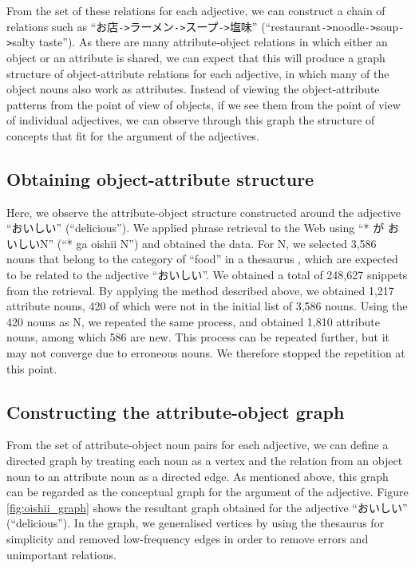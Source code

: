 \documentclass[english]{jnlp_1.4}
\begin{document}
From the set of these relations for each adjective, we can construct
a chain of relations such as ``お店\verb+->+ラーメン\verb+->+スープ\verb+->+塩味''
(``restaurant\verb|->|noodle\verb|->|soup\verb|->|salty taste''). As
there are many attribute-object relations in which either an object
or an attribute is shared, we can expect that this will produce
a graph structure of object-attribute relations for each adjective,
in which many of the object nouns also work as attributes.
Instead of viewing the object-attribute patterns from the point of view of
objects, if we see them from the point of view of individual adjectives,
we can observe through this graph the structure of concepts that fit for 
the argument of the adjectives.

\subsection{Obtaining object-attribute structure}

Here, we observe the attribute-object structure constructed around the adjective
``おいしい'' (``delicious''). We applied phrase retrieval to the Web using 
``* が おいしいN'' (``* ga oishii N'') and obtained the data. For N, we selected 
3,586 nouns that belong to the category of ``food'' in a thesaurus \cite{ikehara:1997e}, 
which 
are expected to be related to the adjective ``おいしい''. We obtained a total of
248,627 snippets from the retrieval. By applying the method described above, 
we obtained 1,217 attribute nouns, 420 of which were not in the initial list 
of 3,586 nouns.  Using the 420 nouns as N, we repeated the same process, 
and obtained 1,810 attribute nouns, among which 586 are new. This process can 
be repeated further, but it may not converge due to erroneous nouns. 
We therefore stopped the repetition at this point. 

\subsection{Constructing the attribute-object graph}

From the set of attribute-object noun pairs for each adjective, we can
define a directed graph by treating each noun as a vertex and the
relation from an object noun to an attribute noun as a directed edge. As
mentioned above, this graph can be regarded as the conceptual graph for
the argument of the adjective.  Figure \ref{fig:oishii_graph} shows the
resultant graph obtained for the adjective ``おいしい'' (``delicious''). In the graph, we
generalised vertices by using the thesaurus for simplicity and removed
low-frequency edges in order to remove errors and unimportant relations.
\end{document}

